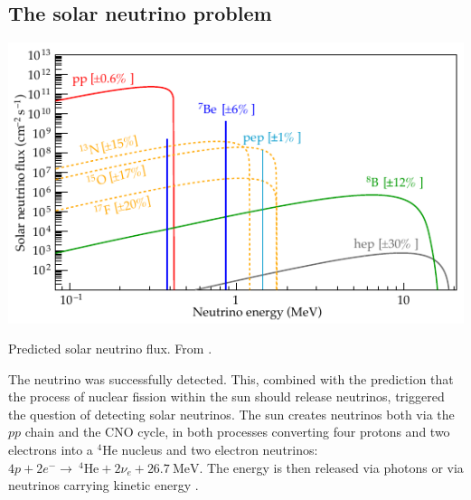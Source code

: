 \documentclass[
    a4paper, %
    fontsize=10pt, %
    twoside=false, %
    numbers=noenddot, %
    fontmethod=tex,
]{kaobook}
\begin{document}
\subsection{The solar neutrino problem}
\begin{marginfigure}
    \includegraphics{theory/solar_neutrinos.pdf}
    \caption[Predicted solar neutrino flux]{Predicted solar neutrino flux. From \cite{Agostini2018}.}
\end{marginfigure}

The neutrino was successfully detected. This, combined with the prediction that the process of nuclear fission within the sun should release neutrinos, triggered the question of detecting solar neutrinos. The sun creates neutrinos both via the $pp$ chain and the CNO cycle, in both processes converting four protons and two electrons into a $^4\text{He}$ nucleus and two electron neutrinos: $4p + 2e^- \rightarrow  ~^4\text{He} + 2\nu_e + \SI{26.7}{\mega\eV}$. The energy is then released via photons or via neutrinos carrying kinetic energy \cite{Giunti2007}.
\end{document}
